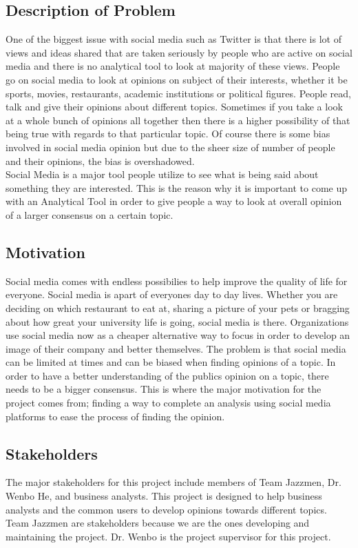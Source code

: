 \documentclass[12pt]{article}
\begin{document}
\subsection*{Description of Problem}
One of the biggest issue with social media such as Twitter is that there is lot of views and ideas shared that are taken seriously by people who are active on social media and there is no analytical tool to look at majority of these views. People go on social media to look at opinions on subject of their interests, whether it be sports, movies, restaurants, academic institutions or political figures. People read, talk and give their opinions about different topics. Sometimes if you take a look at a whole bunch of opinions all together then there is a higher possibility of that being true with regards to that particular topic. Of course there is some bias involved in social media opinion but due to the sheer size of number of people and their opinions, the bias is overshadowed. \\
Social Media is a major tool people utilize to see what is being said about something they are interested. This is the reason why it is important to come up with an Analytical Tool in order to give people a way to look at overall opinion of a larger consensus on a certain topic. 


\subsection*{Motivation}
Social media comes with endless possibilies to help improve the quality of life for everyone. Social media is apart of everyones day to day lives. Whether you are deciding on which restaurant to eat at, sharing a picture of your pets or bragging about how great your university life is going, social media is there. Organizations use social media now as a cheaper alternative way to focus in order to develop an image of their company and better themselves. The problem is that social media can be limited at times and can be biased  when finding opinions of a topic. In order to have a better understanding of the publics opinion on a topic, there needs to be a bigger consensus. This is where the major motivation for the project comes from; finding a way to complete an analysis using social media platforms to ease the process of finding the opinion.\\


\subsection*{Stakeholders}
The major stakeholders for this project include members of Team Jazzmen, Dr. Wenbo He, and business analysts. This project is designed to help business analysts and the common users to develop opinions towards different topics. Team Jazzmen are stakeholders because we are the ones developing and maintaining the project. Dr. Wenbo is the project supervisor for this project.\\
\end{document}
